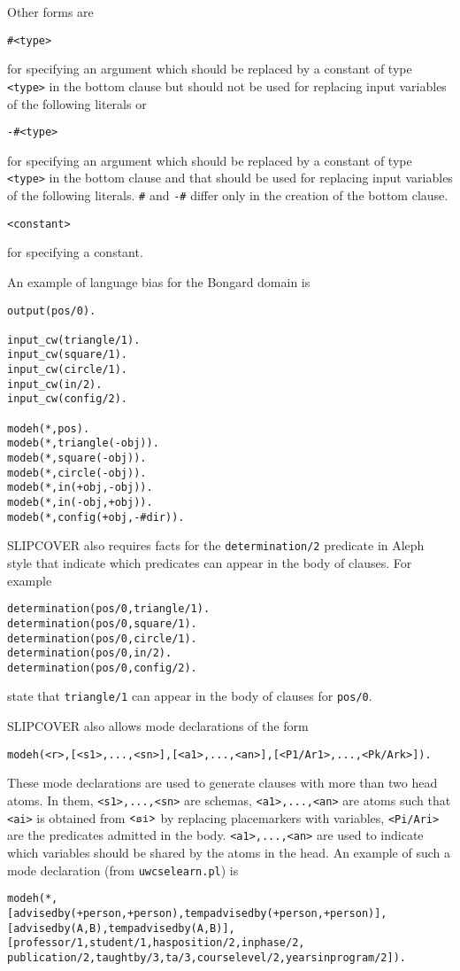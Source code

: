\documentclass[a4paper,10pt]{article}
\begin{document}
Other forms are
\begin{verbatim}
#<type>
\end{verbatim}
for specifying an argument which should be replaced by a constant of type \texttt{<type>} in the bottom clause but should not be used for replacing input variables of the following literals or 
\begin{verbatim}
-#<type>
\end{verbatim}
for specifying an argument which should be replaced by a constant of type \texttt{<type>} in the bottom clause and that should be used for replacing input variables of the following literals. \verb|#| and \verb|-#| differ only in the creation of the bottom clause.
\begin{verbatim}
<constant>
\end{verbatim}
for specifying a constant.

An example of language bias for the Bongard domain is
\begin{verbatim}
output(pos/0).

input_cw(triangle/1).
input_cw(square/1).
input_cw(circle/1).
input_cw(in/2).
input_cw(config/2).

modeh(*,pos).
modeb(*,triangle(-obj)).
modeb(*,square(-obj)).
modeb(*,circle(-obj)).
modeb(*,in(+obj,-obj)).
modeb(*,in(-obj,+obj)).
modeb(*,config(+obj,-#dir)).
\end{verbatim}
SLIPCOVER also requires facts for the \verb|determination/2| predicate in Aleph style that indicate which predicates can appear in the body of clauses. 
For example
\begin{verbatim}
determination(pos/0,triangle/1).
determination(pos/0,square/1).
determination(pos/0,circle/1).
determination(pos/0,in/2).
determination(pos/0,config/2).
\end{verbatim}
state that \verb|triangle/1| can appear in the body of clauses for \verb|pos/0|.

SLIPCOVER also allows mode declarations of the form
\begin{verbatim}
modeh(<r>,[<s1>,...,<sn>],[<a1>,...,<an>],[<P1/Ar1>,...,<Pk/Ark>]). 
\end{verbatim}
These mode declarations are used to generate clauses with more than two head atoms. In them, \verb|<s1>,...,<sn>| are schemas,  \verb|<a1>,...,<an>| are atoms such that \verb|<ai>| is obtained from $\verb|<si>|$ by replacing placemarkers with variables, 
\verb|<Pi/Ari>| are the predicates admitted in the body. \verb|<a1>,...,<an>| are used to indicate which variables should be shared by the atoms in the head.
An example of such a mode declaration (from \verb|uwcselearn.pl|) is
\begin{verbatim}
modeh(*,
[advisedby(+person,+person),tempadvisedby(+person,+person)],
[advisedby(A,B),tempadvisedby(A,B)],
[professor/1,student/1,hasposition/2,inphase/2,
publication/2,taughtby/3,ta/3,courselevel/2,yearsinprogram/2]).
\end{verbatim}
\end{document}
